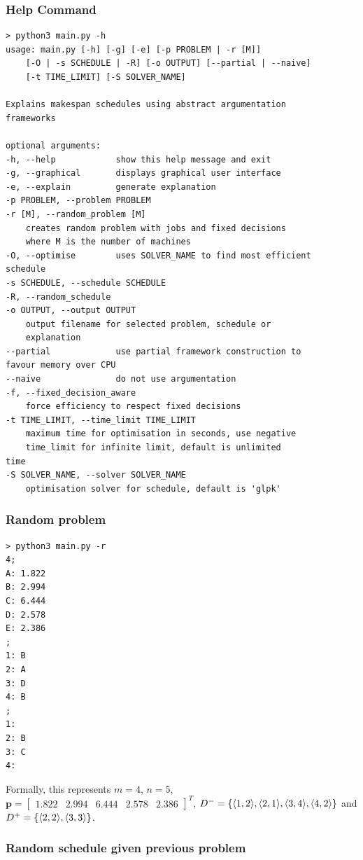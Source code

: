 \subsubsection{Help Command}

\begin{verbatim}
> python3 main.py -h
usage: main.py [-h] [-g] [-e] [-p PROBLEM | -r [M]]
    [-O | -s SCHEDULE | -R] [-o OUTPUT] [--partial | --naive]
    [-t TIME_LIMIT] [-S SOLVER_NAME]

Explains makespan schedules using abstract argumentation
frameworks

optional arguments:
-h, --help            show this help message and exit
-g, --graphical       displays graphical user interface
-e, --explain         generate explanation
-p PROBLEM, --problem PROBLEM
-r [M], --random_problem [M]
    creates random problem with jobs and fixed decisions
    where M is the number of machines
-O, --optimise        uses SOLVER_NAME to find most efficient
schedule
-s SCHEDULE, --schedule SCHEDULE
-R, --random_schedule
-o OUTPUT, --output OUTPUT
    output filename for selected problem, schedule or
    explanation
--partial             use partial framework construction to
favour memory over CPU
--naive               do not use argumentation
-f, --fixed_decision_aware
    force efficiency to respect fixed decisions
-t TIME_LIMIT, --time_limit TIME_LIMIT
    maximum time for optimisation in seconds, use negative
    time_limit for infinite limit, default is unlimited
time
-S SOLVER_NAME, --solver SOLVER_NAME
    optimisation solver for schedule, default is 'glpk'
\end{verbatim}

\subsubsection{Random problem}

\begin{verbatim}
> python3 main.py -r
4;
A: 1.822
B: 2.994
C: 6.444
D: 2.578
E: 2.386
;
1: B
2: A
3: D
4: B
;
1: 
2: B
3: C
4:
\end{verbatim}

Formally, this represents $m=4$, $n=5$, $\mathbf{p}=\begin{bmatrix}
	1.822&2.994&6.444&2.578&2.386
\end{bmatrix}^T$, $D^-=\{\langle{1},{2}\rangle,\langle{2},{1}\rangle,\langle{3},{4}\rangle,\langle{4},{2}\rangle\}$ and $D^+=\{\langle{2},{2}\rangle, \langle{3},{3}\rangle\}$.

\subsubsection{Random schedule given previous problem}

